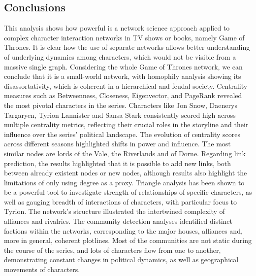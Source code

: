 \documentclass[10pt,twocolumn,letterpaper]{article}
\begin{document}
\subsection{Conclusions}

This analysis shows how powerful is a network science approach applied to complex character interaction networks in TV shows or books, namely Game of Thrones. It is clear how the use of separate networks allows better understanding of underlying dynamics among characters, which would not be visible from a massive single graph.
Considering the whole Game of Thrones network, we can conclude that it is a small-world network, with homophily analysis showing its disassortativity, which is coherent in a hierarchical and feudal society.
Centrality measures such as Betweenness, Closeness, Eigenvector, and PageRank revealed the most pivotal characters in the series. Characters like Jon Snow, Daenerys Targaryen, Tyrion Lannister and Sansa Stark consistently scored high across multiple centrality metrics, reflecting their crucial roles in the storyline and their influence over the series' political landscape. The evolution of centrality scores across different seasons highlighted shifts in power and influence.
The most similar nodes are lords of the Vale, the Riverlands and of Dorne. Regarding link prediction, the results highlighted that it is possible to add new links, both between already existent nodes or new nodes, although results also highlight the limitations of only using degree as a proxy.
Triangle analysis has been shown to be a powerful tool to investigate strength of relationships of specific characters, as well as gauging breadth of interactions of characters, with particular focus to Tyrion.
The network's structure illustrated the intertwined complexity of alliances and rivalries. The community detection analyses identified distinct factions within the networks, corresponding to the major houses, alliances and, more in general, coherent plotlines. Most of the communities are not static during the course of the series, and lots of characters flow from one to another, demonstrating constant changes in political dynamics, as well as geographical movements of characters.


{\small


}
\end{document}
